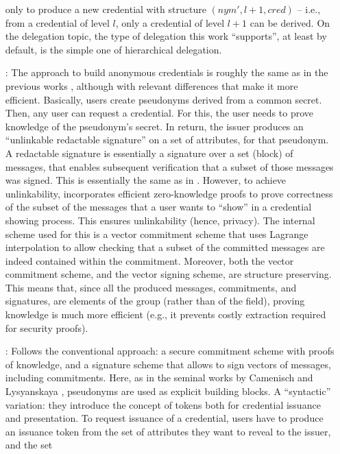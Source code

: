 \begin{enumerate}
  only to produce a new credential with structure $(nym', l+1, cred)$ -- i.e.,
  from a credential of level $l$, only a credential of level $l+1$ can be
  derived. On the delegation topic, the type of delegation this work ``supports'',
  at least by default, is the simple one of hierarchical delegation.
\item[\cite{cdhk15}:] The approach to build anonymous credentials is roughly
  the same as in the previous works \cite{cl01,cl02,cl04}, although with
  relevant differences that make it more efficient. Basically, users create
  pseudonyms derived from a common secret. Then, any user can request a
  credential. For this, the user needs to prove knowledge of the pseudonym's
  secret. In return, the issuer produces an ``unlinkable redactable signature''
  on a set of attributes, for that pseudonym. A redactable signature is
  essentially a signature over a set (block) of messages, that enables
  subsequent verification that a subset of those messages was signed. This
  is essentially the same as in \cite{cl02,cl04}. However, to achieve
  unlinkability, \cite{cdhk15} incorporates efficient zero-knowledge proofs
  to prove correctness of the subset of the messages that a user wants to
  ``show'' in a credential showing process. This ensures unlinkability (hence,
  privacy). The internal scheme used for this is a vector commitment scheme
  that uses Lagrange interpolation to allow checking that a subset of the
  committed messages are indeed contained within the commitment. Moreover,
  both the vector commitment scheme, and the vector signing scheme, are
  structure preserving. This means that, since all the produced messages,
  commitments, and signatures, are elements of the group (rather than of the
  field), proving knowledge is much more efficient (e.g., it prevents costly
  extraction required for security proofs).
\item[\cite{ckl+15}:] Follows the conventional approach: a secure commitment
  scheme with proofs of knowledge, and a signature scheme that allows to
  sign vectors of messages, including commitments. Here, as in the seminal
  works by Camenisch and Lysyanskaya \cite{cl01,cl02,cl04}, pseudonyms are
  used as explicit building blocks. 
  A ``syntactic'' variation: they introduce
  the concept of tokens both for credential issuance and presentation. To
  request issuance of a credential, users have to produce an issuance token
  from the set of attributes they want to reveal to the issuer, and the set

\end{enumerate}
